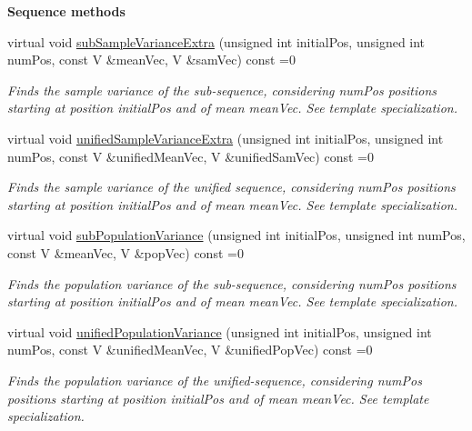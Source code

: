 \begin{Indent}{\bf Sequence methods}
\begin{DoxyCompactItemize}
virtual void \hyperlink{class_q_u_e_s_o_1_1_base_vector_sequence_a6a786862951dfae45a9daebc9d81e676}{sub\-Sample\-Variance\-Extra} (unsigned int initial\-Pos, unsigned int num\-Pos, const V \&mean\-Vec, V \&sam\-Vec) const =0
\begin{DoxyCompactList}\small\item\em Finds the sample variance of the sub-\/sequence, considering {\ttfamily num\-Pos} positions starting at position {\ttfamily initial\-Pos} and of mean {\ttfamily mean\-Vec}. See template specialization. \end{DoxyCompactList}\item 
virtual void \hyperlink{class_q_u_e_s_o_1_1_base_vector_sequence_abc759076a4c5d9e1586a6d93629778ff}{unified\-Sample\-Variance\-Extra} (unsigned int initial\-Pos, unsigned int num\-Pos, const V \&unified\-Mean\-Vec, V \&unified\-Sam\-Vec) const =0
\begin{DoxyCompactList}\small\item\em Finds the sample variance of the unified sequence, considering {\ttfamily num\-Pos} positions starting at position {\ttfamily initial\-Pos} and of mean {\ttfamily mean\-Vec}. See template specialization. \end{DoxyCompactList}\item 
virtual void \hyperlink{class_q_u_e_s_o_1_1_base_vector_sequence_af21f1923841372684ae9e5812767832d}{sub\-Population\-Variance} (unsigned int initial\-Pos, unsigned int num\-Pos, const V \&mean\-Vec, V \&pop\-Vec) const =0
\begin{DoxyCompactList}\small\item\em Finds the population variance of the sub-\/sequence, considering {\ttfamily num\-Pos} positions starting at position {\ttfamily initial\-Pos} and of mean {\ttfamily mean\-Vec}. See template specialization. \end{DoxyCompactList}\item 
virtual void \hyperlink{class_q_u_e_s_o_1_1_base_vector_sequence_ad9e165f7a0d57e2fa45e7b3926dac1a2}{unified\-Population\-Variance} (unsigned int initial\-Pos, unsigned int num\-Pos, const V \&unified\-Mean\-Vec, V \&unified\-Pop\-Vec) const =0
\begin{DoxyCompactList}\small\item\em Finds the population variance of the unified-\/sequence, considering {\ttfamily num\-Pos} positions starting at position {\ttfamily initial\-Pos} and of mean {\ttfamily mean\-Vec}. See template specialization. \end{DoxyCompactList}\item 

\end{DoxyCompactItemize}
\end{Indent}
